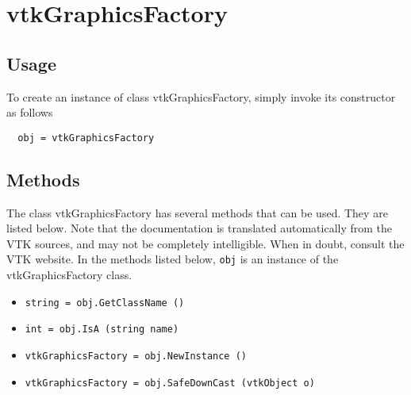 \section{vtkGraphicsFactory}

\subsection{Usage}


To create an instance of class vtkGraphicsFactory, simply
invoke its constructor as follows
\begin{verbatim}
  obj = vtkGraphicsFactory
\end{verbatim}
\subsection{Methods}

The class vtkGraphicsFactory has several methods that can be used.
  They are listed below.
Note that the documentation is translated automatically from the VTK sources,
and may not be completely intelligible.  When in doubt, consult the VTK website.
In the methods listed below, \verb|obj| is an instance of the vtkGraphicsFactory class.
\begin{itemize}
\item  \verb|string = obj.GetClassName ()|

\item  \verb|int = obj.IsA (string name)|

\item  \verb|vtkGraphicsFactory = obj.NewInstance ()|

\item  \verb|vtkGraphicsFactory = obj.SafeDownCast (vtkObject o)|

\end{itemize}
